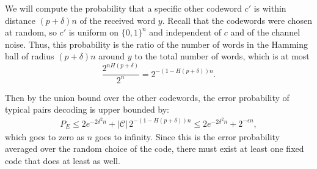 We will compute the probability that a specific other codeword \(c'\) is within distance \((p + \delta)n\) of the received word \(y\). Recall that the codewords were chosen at random, so \(c'\) is uniform on \(\{0,1\}^n\) and independent of \(c\) and of the channel noise. Thus, this probability is the ratio of the number of words in the Hamming ball of radius \((p+\delta)n\) around \(y\) to the total number of words, which is at most
\[\frac{2^{n H(p+\delta)}}{2^n} = 2^{-(1-H(p+\delta))n}.\]

Then by the union bound over the other codewords, the error probability of typical pairs decoding is upper bounded by:
\begin{align*}
    P_{E} \leq 2e^{-2\delta^2 n} + |\mathcal{C}|\, 2^{-(1-H(p+\delta))n} \leq 2e^{-2\delta^2 n} + 2^{-\epsilon n},
\end{align*}
which goes to zero as \(n\) goes to infinity. Since this is the error probability averaged over the random choice of the code, there must exist at least one fixed code that does at least as well.
